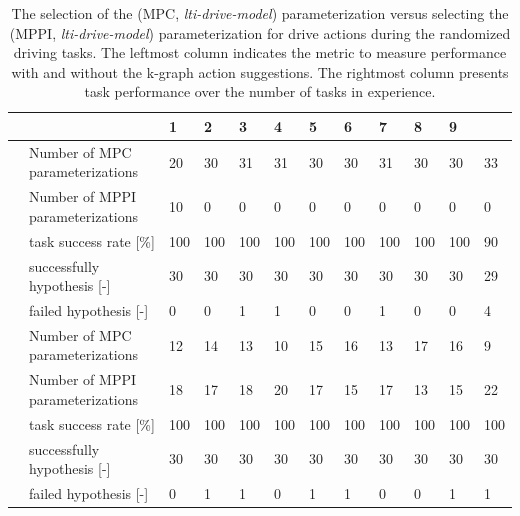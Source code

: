 \begin{table}[H]
    \caption{The selection of the (\ac{MPC}, \textit{lti-drive-model}) parameterization versus selecting the (\ac{MPPI}, \textit{lti-drive-model}) parameterization for drive actions during the randomized driving tasks. The leftmost column indicates the metric to measure performance  with and without the \ac{k-graph} action suggestions. The rightmost column presents task performance over the number of tasks in experience.}%
    \label{table:rand_drive_mpc_vs_mppi}
    \centering
    \begin{tabular}%
      {%
        >{\raggedright\arraybackslash}p{}
        >{\raggedright\arraybackslash}p{}
      |p{0.4cm}p{0.4cm}p{0.4cm}p{0.4cm}p{0.4cm}p{0.4cm}p{0.4cm}p{0.4cm}p{0.4cm}p{0.4cm}}
      \multicolumn{2}{c|}{Number of Tasks in experience} &0&1&2&3&4&5&6&7&8&9\\\toprule
      \multirow{5}{0.1\textwidth}{With \ac{k-graph} suggestions} 
      &Number of \ac{MPC} parameterizations&20&30&31&31&30&30&31&30&30&33\\
      &Number of \ac{MPPI} parameterizations&10&0&0&0&0&0&0&0&0&0\\
      & task success rate [\%]& 100& 100& 100& 100& 100& 100& 100& 100& 100& 90\\
      & successfully hypothesis [-]& 30& 30& 30& 30& 30& 30& 30& 30& 30& 29\\
      & failed hypothesis [-]& 0& 0& 1& 1& 0& 0& 1& 0& 0& 4\\\midrule
      \multirow{5}{0.1\textwidth}{Without \ac{k-graph} suggestions} 
      &Number of \ac{MPC} parameterizations&12&14&13&10&15&16&13&17&16&9\\
      &Number of \ac{MPPI} parameterizations&18&17&18&20&17&15&17&13&15&22\\
      & task success rate [\%]& 100& 100& 100& 100& 100& 100& 100& 100& 100& 100\\
      & successfully hypothesis [-]& 30& 30& 30& 30& 30& 30& 30& 30& 30& 30\\
      & failed hypothesis [-]& 0& 1& 1& 0& 1& 1& 0& 0& 1& 1\\
    \end{tabular}
\end{table}

